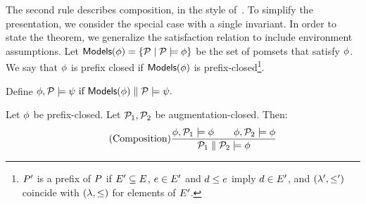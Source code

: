 The second rule describes composition, in the style of~\citet{Abadi:1993:CS:151646.151649}.  To simplify the presentation, we
consider the special case with a single invariant.
In order to state the theorem, we generalize the satisfaction relation to
include environment assumptions.  Let
\begin{math}
  \textsf{Models}{(\phi)} = \{ \mathcal{P} \mid \mathcal{P} \models \phi \}
\end{math}
be the set of pomsets that satisfy $\phi$.  We say that $\phi$ is prefix
closed if $\textsf{Models}{(\phi)}$ is prefix-closed\footnote{$P'$ is a prefix of
  $P$ if $E'\subseteq E$, $e\in E'$ and $ d\le e$
  imply $d\in E'$, and $(\lambda',\le')$ coincide with
  $(\lambda,\le)$ for elements of $E'$.}.
\begin{noenv}
  Define
  \begin{math}
    \phi, \mathcal{P} \models \psi  \text{ if } \textsf{Models}{(\phi)} \parallel \mathcal{P} \models \psi.
  \end{math}
\end{noenv}
\begin{proposition}%
  Let $\phi$ be prefix-closed.  Let $\mathcal{P}_1, \mathcal{P}_2$ be
  augmentation-closed.%
  Then:
  \begin{displaymath}
    \tag{Composition}
    \frac{
      \phi, \mathcal{P}_1 \models\phi
      \qquad
      \phi, \mathcal{P}_2 \models\phi
    }{\mathcal{P}_1 \parallel \mathcal{P}_2 \models \phi}
  \end{displaymath}
\end{proposition}
